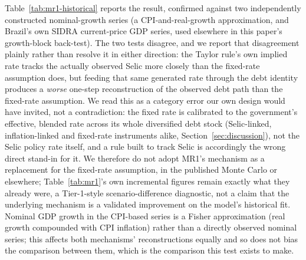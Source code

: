 \documentclass[11pt,a4paper]{article}
\begin{document}
Table~\ref{tab:mr1-historical} reports the result, confirmed against two independently constructed nominal-growth series (a CPI-and-real-growth approximation, and Brazil's own SIDRA current-price GDP series, used elsewhere in this paper's growth-block back-test). The two tests disagree, and we report that disagreement plainly rather than resolve it in either direction: the Taylor rule's own implied rate tracks the actually observed Selic more closely than the fixed-rate assumption does, but feeding that same generated rate through the debt identity produces a \emph{worse} one-step reconstruction of the observed debt path than the fixed-rate assumption. We read this as a category error our own design would have invited, not a contradiction: the fixed rate is calibrated to the government's effective, blended rate across its whole diversified debt stock (Selic-linked, inflation-linked and fixed-rate instruments alike, Section~\ref{sec:discussion}), not the Selic policy rate itself, and a rule built to track Selic is accordingly the wrong direct stand-in for it. We therefore do not adopt MR1's mechanism as a replacement for the fixed-rate assumption, in the published Monte Carlo or elsewhere; Table~\ref{tab:mr1}'s own incremental figures remain exactly what they already were, a Tier-1-style scenario-difference diagnostic, not a claim that the underlying mechanism is a validated improvement on the model's historical fit. Nominal GDP growth in the CPI-based series is a Fisher approximation (real growth compounded with CPI inflation) rather than a directly observed nominal series; this affects both mechanisms' reconstructions equally and so does not bias the comparison between them, which is the comparison this test exists to make.

\begin{table}[htbp]
\centering\small
\caption{MR1 against history: one-step debt/GDP reconstruction error and nominal-Selic tracking error, fixed-rate vs.\ Taylor-rule mechanism, 2000--2024 (RMSE, percentage points).}
\label{tab:mr1-historical}
\end{table}
\end{document}
